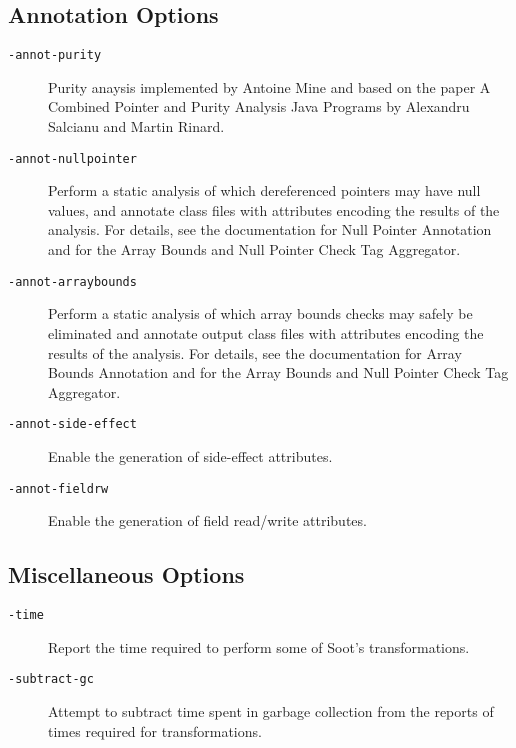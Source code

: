 \documentclass{article}
\begin{document}
\subsection{Annotation Options}


\begin{description}

  \item[
  {\tt -annot-purity}]

Purity anaysis implemented by Antoine Mine and based on the paper
A Combined Pointer and Purity Analysis Java Programs
by Alexandru Salcianu and Martin Rinard.



  \item[
  {\tt -annot-nullpointer}]

Perform a static analysis of which dereferenced pointers may have
null values, and annotate class files with attributes
encoding the results of the analysis.  For details, see the 
documentation for Null Pointer Annotation and for the 
Array Bounds and Null Pointer Check Tag Aggregator.



  \item[
  {\tt -annot-arraybounds}]

Perform a static analysis of which array bounds checks may safely
be eliminated and annotate output class files with attributes
encoding the results of the analysis. For details, see the
documentation for Array Bounds Annotation and for the Array
Bounds and Null Pointer Check Tag Aggregator.



  \item[
  {\tt -annot-side-effect}]

Enable the generation of side-effect attributes.



  \item[
  {\tt -annot-fieldrw}]
Enable the generation of field read/write attributes.


\end{description}


\subsection{Miscellaneous Options}


\begin{description}

  \item[
  {\tt -time}]

Report the time required to perform some of Soot's transformations.



  \item[
  {\tt -subtract-gc}]

Attempt to subtract time spent in garbage collection from
the reports of times required for transformations.



\end{description}
\end{document}
